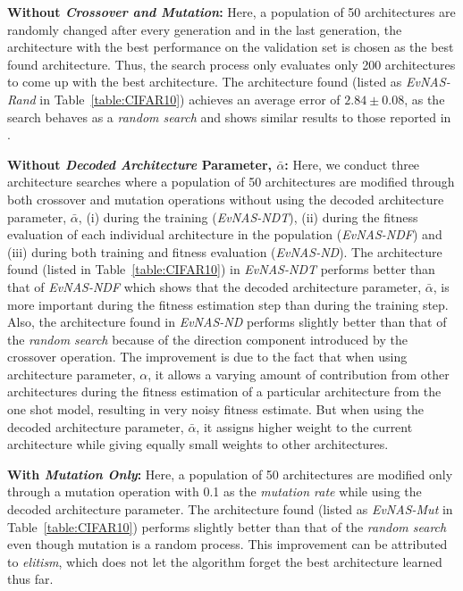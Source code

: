 \documentclass[final]{cvpr}
\begin{document}
\textbf{Without \textit{Crossover and Mutation}:} Here, a population of 50 architectures are
randomly changed after every generation and in the last generation, the architecture with the best
performance on the validation set is chosen as the best found architecture. Thus, the search
process only evaluates only 200 architectures to come up with the best architecture. The
architecture found (listed as \textit{EvNAS-Rand} in Table~\ref{table:CIFAR10}) achieves an average
error of $2.84\pm0.08$, as the search behaves as a \textit{random search} and shows similar results
to those reported in \cite{li2019random}.

\textbf{Without \textit{Decoded Architecture} Parameter, $\bar{\alpha}$:} Here, we conduct three
architecture searches where a population of 50 architectures are modified through both crossover
and mutation operations without using the decoded architecture parameter, $\bar{\alpha}$, (i)
during the training (\textit{EvNAS-NDT}), (ii) during the fitness evaluation of each individual
architecture in the population (\textit{EvNAS-NDF}) and (iii) during both training and fitness
evaluation (\textit{EvNAS-ND}). The architecture found (listed in Table~\ref{table:CIFAR10})
in \textit{EvNAS-NDT} performs better than that of \textit{EvNAS-NDF} which shows that the decoded
architecture parameter, $\bar{\alpha}$, is more important during the fitness estimation step
than during the training step. Also, the architecture found in \textit{EvNAS-ND} performs slightly
better than that of the \textit{random search} because of the direction component introduced by the
crossover operation. The improvement is due to the fact that when using architecture
parameter, $\alpha$, it allows a varying amount of contribution from other architectures during the
fitness estimation of a particular architecture from the one shot model, resulting in very noisy
fitness estimate. But when using the decoded architecture parameter, $\bar{\alpha}$, it assigns
higher weight to the current architecture while giving equally small weights to other architectures.

\textbf{With \textit{Mutation Only}:} Here, a population of 50 architectures are modified only
through a mutation operation with 0.1 as the \textit{mutation rate} while using the decoded
architecture parameter. The architecture found (listed as
\textit{EvNAS-Mut} in Table~\ref{table:CIFAR10}) performs slightly better than that of the
\textit{random search} even though mutation is a random process. This improvement can be attributed
to \textit{elitism}, which does not let the algorithm forget the best architecture learned thus far. 
\end{document}
